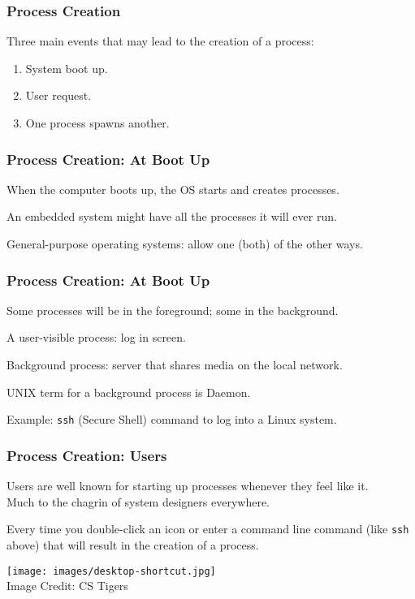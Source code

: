 \begin{frame}
	\frametitle{Process Creation}

	Three main events that may lead to the creation of a process:

	\begin{enumerate}
		\item System boot up.
		\item User request.
		\item One process spawns another.
	\end{enumerate}


\end{frame}

\begin{frame}
	\frametitle{Process Creation: At Boot Up}

	When the computer boots up, the OS starts and creates processes.

	An embedded system might have all the processes it will ever run.

	General-purpose operating systems: allow one (both) of the other ways.


\end{frame}

\begin{frame}
	\frametitle{Process Creation: At Boot Up}

	Some processes will be in the foreground; some in the background.

	A user-visible process: log in screen.

	Background process: server that shares media on the local network.

	UNIX term for a background process is \alert{Daemon}.

	Example: \texttt{ssh} (Secure Shell) command to log into a Linux system.


\end{frame}

\begin{frame}
	\frametitle{Process Creation: Users}

	Users are well known for starting up processes whenever they feel like it.\\
	\quad Much to the chagrin of system designers everywhere.

	Every time you double-click an icon or enter a command line command (like \texttt{ssh} above) that will result in the creation of a process.


	\begin{center}
		\texttt{[image: images/desktop-shortcut.jpg]}\\
		{\footnotesize Image Credit: CS Tigers}
	\end{center}

\end{frame}

